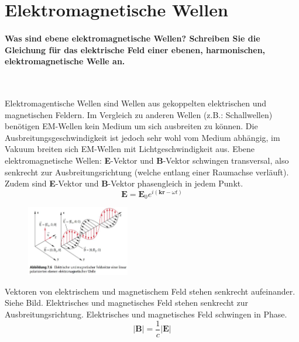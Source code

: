 \documentclass[a4paper, 11pt, ngerman, parskip=half-]{scrartcl}
\begin{document}
\newpage

\section{Elektromagnetische Wellen}

\paragraph{Was sind ebene elektromagnetische Wellen? Schreiben Sie die Gleichung für das elektrische
    Feld einer ebenen, harmonischen, elektromagnetische Welle an.} ~

Elektromagentische Wellen sind Wellen aus gekoppelten elektrischen und magnetischen Feldern. Im Vergleich zu anderen Wellen (z.B.: Schallwellen) benötigen
EM-Wellen kein Medium um sich ausbreiten zu können. Die Ausbreitungsgeschwindigkeit ist jedoch sehr wohl vom Medium abhängig, im Vakuum breiten sich EM-Wellen mit Lichtgeschwindigkeit aus.
Ebene elektromagnetische Wellen: \textbf{E}-Vektor und \textbf{B}-Vektor schwingen transversal, also senkrecht zur Ausbreitungsrichtung (welche entlang einer Raumachse verläuft). Zudem sind \textbf{E}-Vektor und \textbf{B}-Vektor
phasengleich in jedem Punkt.
\begin{equation}
    \textbf{E} = \textbf{E}_0 e^{i(\textbf{kr} - \omega t)}
\end{equation}

\begin{figure}[H]
    \centering
    \includegraphics[width=0.4\textwidth]{image/13/4.png}
\end{figure}

Vektoren von elektrischem und magnetischem Feld stehen senkrecht aufeinander. Siehe Bild.
Elektrisches und magnetisches Feld stehen senkrecht zur Ausbreitungsrichtung. Elektrisches und
magnetisches Feld schwingen in Phase.
\begin{equation}
    |\textbf{B}| = \frac{1}{c} |\textbf{E}|
\end{equation}
\end{document}
